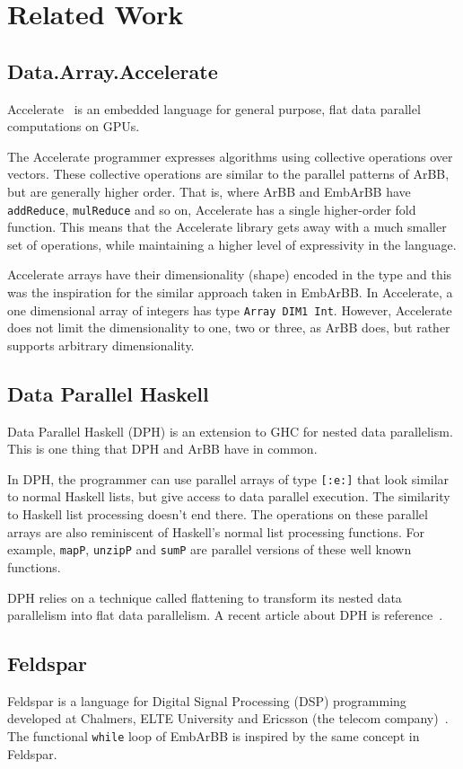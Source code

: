 
\section{Related Work} 
\subsection{Data.Array.Accelerate} 
Accelerate~\cite{accelerate} is an embedded language for general purpose, 
flat data parallel computations on GPUs. 

The Accelerate programmer expresses algorithms using collective operations 
over vectors. These collective operations are similar to the 
parallel patterns of ArBB, but are generally higher order. That is, where 
ArBB and EmbArBB have {\tt addReduce}, {\tt mulReduce} and so on, Accelerate
has a single higher-order fold function. This means that the Accelerate library
gets away with a much smaller set of operations, while maintaining a higher 
level of expressivity in the language. 

Accelerate arrays have their dimensionality (shape) encoded in the type 
and this was the inspiration for the similar approach taken in EmbArBB. In 
Accelerate, a one dimensional array of integers has type {\tt Array DIM1 Int}.
However, Accelerate does not limit the dimensionality to one, two or three,
as ArBB does, but rather supports arbitrary dimensionality.

\subsection{Data Parallel Haskell} 
Data Parallel Haskell (DPH) is an extension to GHC for nested data parallelism. 
This is one thing that DPH and ArBB have in common. 
 
In DPH, the programmer can use parallel arrays of type {\tt [:e:]} that look
similar to normal Haskell lists, but give access to data parallel execution.
The similarity to Haskell list processing doesn't end there. The operations 
on these parallel arrays are also reminiscent of Haskell's normal list processing functions.
For example, {\tt mapP}, {\tt unzipP} and {\tt sumP} are parallel versions of 
these well known functions. 

DPH relies on a technique called flattening to transform its nested data parallelism 
into flat data parallelism. 
A recent article about DPH is reference~\cite{DPH}. 
  
 

\subsection{Feldspar} 
Feldspar is a language for Digital Signal Processing (DSP) programming
developed at Chalmers, ELTE University and Ericsson 
(the telecom company)~\cite{FELDSPAR2010}. The functional {\tt while} loop 
of EmbArBB is inspired by the same concept in Feldspar. 

